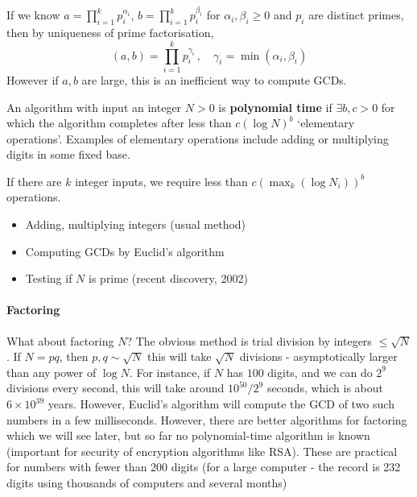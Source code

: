\documentclass{article}
\begin{document}

If we know $a = \prod_{i=1}^k p_i^{\alpha_i}$, $b = \prod_{i=1}^k p_i^{\beta_i}$ for $\alpha_i, \beta_i \geq 0$ and $p_i$ are distinct primes, then by uniqueness of prime factorisation,
\begin{equation*}
    (a, b) = \prod_{i=1}^k p_i^{\gamma_i} \, , \quad \gamma_i = \min(\alpha_i, \beta_i)
\end{equation*}
However if $a, b$ are large, this is an inefficient way to compute GCDs.
\begin{defi}
    An algorithm with input an integer $N> 0$ is \textbf{polynomial time} if $\exists b, c > 0$ for which the algorithm completes after less than $c (\log N)^b$ `elementary operations'.
    Examples of elementary operations include adding or multiplying digits in some fixed base.

    If there are $k$ integer inputs, we require less than $c (\max_k(\log N_i))^b$ operations.
\end{defi}

\begin{eg}\leavevmode
    \begin{itemize}
        \item Adding, multiplying integers (usual method)
        \item Computing GCDs by Euclid's algorithm
        \item Testing if $N$ is prime (recent discovery, 2002)
    \end{itemize}
\end{eg}

\paragraph{Factoring} What about factoring $N$? The obvious method is trial division by integers $\leq \sqrt{N}$. If $N = pq$, then $p, q \sim \sqrt{N}$ this will take $\sqrt{N}$ divisions - asymptotically larger than any power of $\log N$.
For instance, if $N$ has $100$ digits, and we can do $2^9$ divisions every second, this will take around $10^{50} / 2^9$ seconds, which is about $6 \times 10^{39}$ years.  However, Euclid's algorithm will compute the GCD of two such numbers in a few milliseconds.
However, there are better algorithms for factoring which we will see later, but so far no polynomial-time algorithm is known (important for security of encryption algorithms like RSA).
These are practical for numbers with fewer than 200 digits (for a large computer - the record is 232 digits using thousands of computers and several months)
\end{document}
